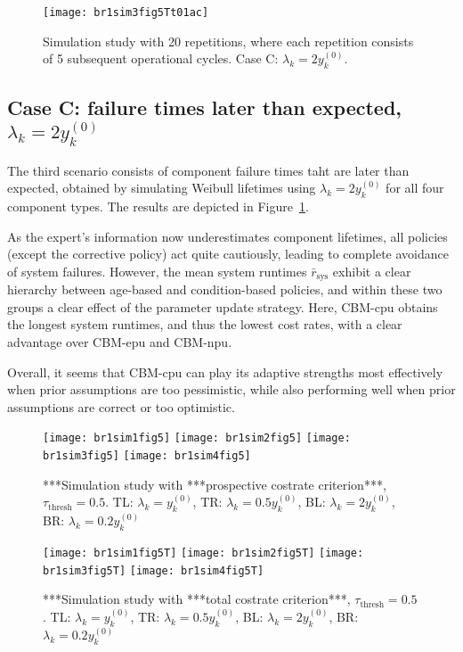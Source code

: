 \documentclass[authoryear]{elsarticle}
\newcommand{\uz}{^{(0)}} %
\def\ykz{y\uz_k}
\newcommand{\tthresh}{\tau_{\text{thresh}}}
\newcommand{\mrsys}{\bar{r}_\text{sys}}
\begin{document}
\begin{figure}
\texttt{[image: br1sim3fig5Tt01ac]}
\caption{Simulation study with 20 repetitions, where each repetition consists of 5 subsequent operational cycles.
Case C: $\lambda_k = 2\ykz$.}
\label{fig:br1sim3fig5Tt01}
\end{figure}

\subsection{Case C: failure times later than expected, $\lambda_k = 2 \ykz$}
\label{sec:case3}

The third scenario consists of component failure times taht are later than expected,
obtained by simulating Weibull lifetimes using $\lambda_k = 2 \ykz$ for all four component types.
The results are depicted in Figure~\ref{fig:br1sim3fig5Tt01}.

As the expert's information now underestimates component lifetimes,
all policies (except the corrective policy) act quite cautiously,
leading to complete avoidance of system failures.
However, the mean system runtimes $\mrsys$ exhibit
a clear hierarchy between age-based and condition-based policies,
and within these two groups a clear effect of the parameter update strategy.
Here, CBM-cpu obtains the longest system runtimes, and thus the lowest cost rates,
with a clear advantage over CBM-epu and CBM-npu.

Overall, it seems that CBM-cpu can play its adaptive strengths most effectively
when prior assumptions are too pessimistic,
while also performing well when prior assumptions are correct or too optimistic.


\iffalse
\begin{figure}
\texttt{[image: br1sim1fig5]}
\texttt{[image: br1sim2fig5]}
\texttt{[image: br1sim3fig5]}
\texttt{[image: br1sim4fig5]}
\caption{***Simulation study with ***prospective costrate criterion***, $\tthresh = 0.5$.
TL: $\lambda_k =     \ykz$,
TR: $\lambda_k = 0.5 \ykz$,
BL: $\lambda_k = 2   \ykz$,
BR: $\lambda_k = 0.2 \ykz$}
\label{fig:simprospcostrate05}
\end{figure}

\begin{figure}
\texttt{[image: br1sim1fig5T]}
\texttt{[image: br1sim2fig5T]}
\texttt{[image: br1sim3fig5T]}
\texttt{[image: br1sim4fig5T]}
\caption{***Simulation study with ***total costrate criterion***, $\tthresh = 0.5$.
TL: $\lambda_k =     \ykz$,
TR: $\lambda_k = 0.5 \ykz$,
BL: $\lambda_k = 2   \ykz$,
BR: $\lambda_k = 0.2 \ykz$}
\label{fig:simtotalcostrate05}
\end{figure}
\end{document}
